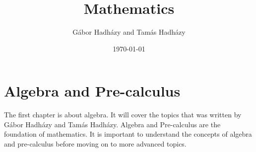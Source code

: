 \documentclass[a4paper,12pt]{book}
\author{Gábor Hadházy and Tamás Hadházy}
\title{Mathematics}
\date{\today}
\begin{document}
\maketitle

\tableofcontents

\chapter{Algebra and Pre-calculus}
The first chapter is about algebra. It will cover the topics that was written by Gábor Hadházy and Tamás Hadházy. Algebra and Pre-calculus are the foundation of mathematics. It is important to understand the concepts of algebra and pre-calculus before moving on to more advanced topics.


\end{document}
